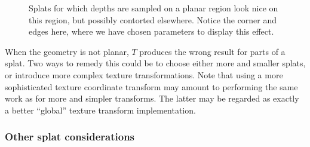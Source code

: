 \documentclass[10pt,conference,compsocconf]{IEEEtran}
\begin{document}
\begin{figure}[htb]
  \centering
  \caption{\label{fig:LargeSplatsOnCorners}
           Splats for which depths are sampled on a planar region look nice on
  this region, but possibly contorted elsewhere. Notice the corner and edges
  here, where we have chosen parameters to display this effect.}
\end{figure}

When the geometry is not planar, $T$ produces the wrong result for parts of a
splat.  Two ways to remedy this could be to choose either more and smaller
splats, or introduce more complex texture transformations. Note that using a
more sophisticated texture coordinate transform may amount to performing the
same work as for more and simpler transforms. The latter may be regarded as
exactly a better ``global'' texture transform implementation.


\subsubsection{Other splat considerations}
\label{sec:proxyModelReplacement}
\end{document}
